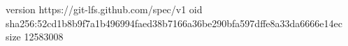 version https://git-lfs.github.com/spec/v1
oid sha256:52cd1b8b9f7a1b496994faed38b7166a36be290bfa597dffe8a33da6666e14ec
size 12583008

